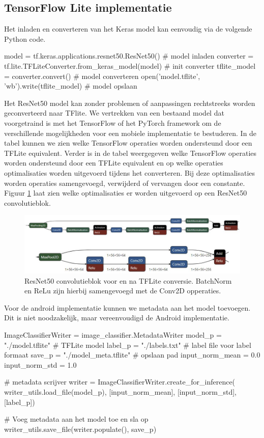 \subsection{TensorFlow Lite implementatie} \label{tf_h_conv}
Het inladen en converteren van het Keras model kan eenvoudig via de volgende Python code.

\begin{python}
model = tf.keras.applications.resnet50.ResNet50() # model inladen
converter = tf.lite.TFLiteConverter.from_keras_model(model) # init converter
tflite_model = converter.convert() # model converteren
open('model.tflite', 'wb').write(tflite_model) # model opslaan
\end{python}

Het ResNet50 model kan zonder problemen of aanpassingen rechtstreeks worden geconverteerd naar TFlite.
We vertrekken van een bestaand model dat voorgetraind is met het TensorFlow of het PyTorch framework om de verschillende mogelijkheden voor een mobiele implementatie te bestuderen.
In de tabel kunnen we zien welke TensorFlow operaties worden ondersteund door een TFLite equivalent.
Verder is in de tabel weergegeven welke TensorFlow operaties worden ondersteund door een TFLite equivalent en op welke operaties optimalisaties worden uitgevoerd tijdens het converteren. 
Bij deze optimalisaties worden operaties samengevoegd, verwijderd of vervangen door een constante.
Figuur \ref{fig:class_opt} laat zien welke optimalisaties er worden uitgevoerd op een ResNet50 convolutieblok.

\begin{figure}[!ht]
	\centering
	\includegraphics[width=1.0\linewidth]{fig/class_opt.jpg}
	\caption{ResNet50 convolutieblok voor en na TFLite conversie. BatchNorm en ReLu zijn hierbij samengevoegd met de Conv2D opperaties.}
	\label{fig:class_opt}
\end{figure}

Voor de android implementatie kunnen we metadata aan het model toevoegen.
Dit is niet noodzakelijk, maar vereenvoudigd de Android implementatie.
\begin{python} 
ImageClassifierWriter = image_classifier.MetadataWriter
model_p = "./model.tflite" # TFLite model
label_p = "./labels.txt" # label file voor label formaat
save_p = "./model_meta.tflite" # opslaan pad
input_norm_mean = 0.0
input_norm_std = 1.0
    
# metadata scrijver
writer = ImageClassifierWriter.create_for_inference(
    writer_utils.load_file(model_p), [input_norm_mean], [input_norm_std],
    [label_p])
    
# Voeg metadata aan het model toe en sla op
writer_utils.save_file(writer.populate(), save_p)
\end{python}

